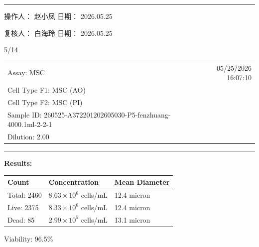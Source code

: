 \documentclass[UTF8,10pt,a4paper,fontset=fandol]{ctexart}
\newcommand{\fieldvalue}[1]{#1}
\newcommand{\handwritten}[1]{#1}
\begin{document}
\medskip
\hrule
\medskip

\noindent
操作人：
\fieldvalue{\handwritten{赵小凤}}
\hfill
日期：
\fieldvalue{\handwritten{2026.05.25}}

\medskip

\noindent
复核人：
\fieldvalue{\handwritten{白海玲}}
\hfill
日期：
\fieldvalue{\handwritten{2026.05.25}}

\bigskip

\handwritten{5/14}

\newpage

\noindent
\begin{tabularx}{\textwidth}{@{}Xr@{}}
Assay: MSC & 05/25/2026 16:07:10 \\
Cell Type F1: MSC (AO) & \\
Cell Type F2: MSC (PI) & \\
Sample ID: 260525-A372201202605030-P5-fenzhuang-4000.1ml-2-2-1 & \\
Dilution: 2.00 &
\end{tabularx}

\vspace{0.5em}
\hrule
\vspace{0.8em}

\noindent\textbf{Results:}

\vspace{0.4em}
\begin{tabular}{@{}lll@{}}
\textbf{Count} & \textbf{Concentration} & \textbf{Mean Diameter} \\
\hline
Total: 2460 & $8.63{\times}10^{6}$ cells/mL & 12.4 micron \\
Live: 2375 & $8.33{\times}10^{6}$ cells/mL & 12.4 micron \\
Dead: 85 & $2.99{\times}10^{5}$ cells/mL & 13.1 micron
\end{tabular}

\vspace{0.8em}

Viability: 96.5\%

\vspace{1em}
\end{document}
